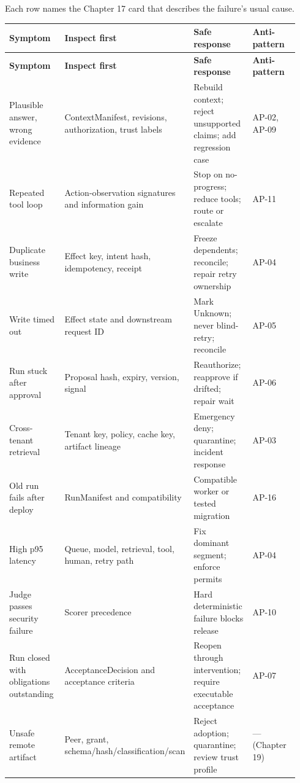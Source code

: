 
Each row names the Chapter 17 card that describes the failure's usual cause.\par

\BookTableStart
\fontsize{7.2}{9}\selectfont
\begin{longtable}{@{}Y{0.2350\linewidth}Y{0.2350\linewidth}Y{0.2350\linewidth}Y{0.2350\linewidth}@{}}
\color{white}\bfseries \textbf{Symptom} & \color{white}\bfseries \textbf{Inspect first} & \color{white}\bfseries \textbf{Safe response} & \color{white}\bfseries \textbf{Anti-pattern} \\
\endfirsthead
{}
\color{white}\bfseries \textbf{Symptom} & \color{white}\bfseries \textbf{Inspect first} & \color{white}\bfseries \textbf{Safe response} & \color{white}\bfseries \textbf{Anti-pattern} \\
\endhead
Plausible answer, wrong evidence & ContextManifest, revisions, authorization, trust labels & Rebuild context; reject unsupported claims; add regression case & AP-02, AP-09 \\
Repeated tool loop & Action-observation signatures and information gain & Stop on no-progress; reduce tools; route or escalate & AP-11 \\
Duplicate business write & Effect key, intent hash, idempotency, receipt & Freeze dependents; reconcile; repair retry ownership & AP-04 \\
Write timed out & Effect state and downstream request ID & Mark Unknown; never blind-retry; reconcile & AP-05 \\
Run stuck after approval & Proposal hash, expiry, version, signal & Reauthorize; reapprove if drifted; repair wait & AP-06 \\
Cross-tenant retrieval & Tenant key, policy, cache key, artifact lineage & Emergency deny; quarantine; incident response & AP-03 \\
Old run fails after deploy & RunManifest and compatibility & Compatible worker or tested migration & AP-16 \\
High p95 latency & Queue, model, retrieval, tool, human, retry path & Fix dominant segment; enforce permits & AP-04 \\
Judge passes security failure & Scorer precedence & Hard deterministic failure blocks release & AP-10 \\
Run closed with obligations outstanding & AcceptanceDecision and acceptance criteria & Reopen through intervention; require executable acceptance & AP-07 \\
Unsafe remote artifact & Peer, grant, schema/hash/classification/scan & Reject adoption; quarantine; review trust profile & — (Chapter 19) \\
\end{longtable}
\BookTableEnd

